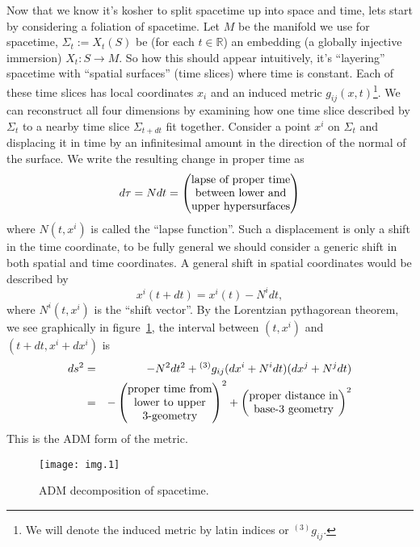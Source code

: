 Now that we know it's kosher to split spacetime up into space and
time, lets start by considering a foliation of spacetime. Let $M$
be the manifold we use for spacetime, $\Sigma_{t}:=X_{t}(S)$
be (for each $t\in\mathbb{R}$) an embedding (a globally injective
immersion) $X_{t}:S\to M$. So how this should appear intuitively,
it's ``layering'' spacetime with ``spatial surfaces''
(time slices) where time is constant. Each of these time
slices has local coordinates $x_i$ and an induced metric
$g_{ij}(x,t)$\footnote{We will denote the induced metric by latin
 indices or ${}^{(3)}g_{ij}$.}. We can reconstruct all four dimensions by
examining how one time slice described by $\Sigma_{t}$ to a
nearby time slice $\Sigma_{t+dt}$ fit together. Consider a point
$x^i$ on $\Sigma_t$ and displacing it in time by an infinitesimal
amount in the direction of the normal of the surface. We write
the resulting change in proper time as
\begin{equation}%
d\tau = Ndt = \begin{pmatrix}$lapse$\ $of$\ $proper$\
$time$\\ $between$\ $lower$\
$and$\\ $upper$\ $hypersurfaces$
\end{pmatrix} 
\end{equation}
where $N(t,x^{i})$ is called the ``lapse function''. Such a
displacement is only a shift in the time coordinate, to be fully
general we should consider a generic shift in both spatial and
time coordinates. A general shift in spatial coordinates would be
described by
\begin{equation}%
x^{i}(t+dt) = x^{i}(t)-N^{i}dt,
\end{equation}
where $N^{i}(t,x^i)$ is the ``shift vector''. By the Lorentzian
pythagorean theorem, we see graphically in figure~\ref{fig:lorentzPyth}, 
the interval between $(t,x^i)$ and $(t+dt,x^i+dx^i)$ is
\begin{eqnarray}%
ds^{2} &=& -N^2dt^2 + {}^{(3)}g_{ij}(dx^i + N^idt)(dx^j + N^jdt)\\
&=&
-\begin{pmatrix} $proper$\ $time$\ $from$\\
$lower$\ $to$\ $upper$\\ $3-geometry$\end{pmatrix}^2
+\begin{pmatrix}$proper$\ $distance$\ $in$\\
$base-3$\ $geometry$\end{pmatrix}^2
\nonumber
\end{eqnarray}
This is the ADM form of the metric.
\begin{figure}[t]
\texttt{[image: img.1]}
\caption{ADM decomposition of spacetime.}\label{fig:lorentzPyth}
\end{figure}

